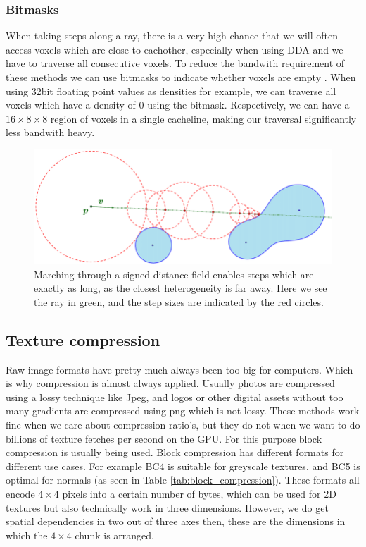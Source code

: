 \subsubsection{Bitmasks} \label{introduction:attribute_separation:bitmasks}
When taking steps along a ray, there is a very high chance that we will often access voxels which are close to eachother, especially when using DDA and we have to traverse all consecutive voxels. To reduce the bandwith requirement of these methods we can use bitmasks to indicate whether voxels are empty \cite{van2015real}\cite{museth2013vdb}. When using 32bit floating point values as densities for example, we can traverse all voxels which have a density of $0$ using the bitmask. Respectively, we can have a $16\times8\times8$ region of voxels in a single cacheline, making our traversal significantly less bandwith heavy.

\begin{figure}
    \centering
    \includegraphics[width=0.9\linewidth]{figures/sdf_ray_marching.png}
    \caption{Marching through a signed distance field enables steps which are exactly as long, as the closest heterogeneity is far away. Here we see the ray in green, and the step sizes are indicated by the red circles. \cite{SDF_sphere_marching}}
    \label{fig:SDF_marching}
\end{figure}



\clearpage\subsection{Texture compression} \label{introduction:texture_compression}
Raw image formats have pretty much always been too big for computers. Which is why compression is almost always applied. Usually photos are compressed using a lossy technique like Jpeg, and logos or other digital assets without too many gradients are compressed using png which is not lossy. These methods work fine when we care about compression ratio's, but they do not when we want to do billions of texture fetches per second on the GPU. For this purpose block compression is usually being used\cite{BlockCompression}. Block compression has different formats for different use cases. For example BC4 is suitable for greyscale textures, and BC5 is optimal for normals (as seen in Table \ref{tab:block_compression}). These formats all encode $4\times 4$ pixels into a certain number of bytes, which can be used for 2D textures but also technically work in three dimensions. However, we do get spatial dependencies in two out of three axes then, these are the dimensions in which the $4\times 4$ chunk is arranged.

